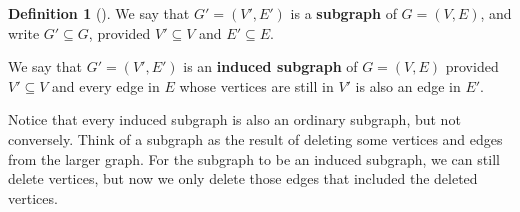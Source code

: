 \documentclass[10pt,]{book}
\newcommand{\terminology}[1]{\textbf{#1}}
\theoremstyle{plain}
\theoremstyle{definition}
\newtheorem{definition}[theorem]{Definition}
\theoremstyle{definition}
\theoremstyle{definition}
\numberwithin{equation}{chapter}
\begin{document}
\begin{definition}[{}]\label{definition-3}
\hypertarget{p-84}{}%
We say that \(G' = (V', E')\) is a \terminology{subgraph} of \(G = (V, E)\), and write \(G' \subseteq G\), provided \(V' \subseteq V\) and \(E' \subseteq E\).%
\par
\hypertarget{p-85}{}%
We say that \(G' = (V', E')\) is an \terminology{induced subgraph} of \(G = (V, E)\) provided \(V' \subseteq V\) and every edge in \(E\) whose vertices are still in \(V'\) is also an edge in \(E'\).%
\end{definition}
\hypertarget{p-86}{}%
Notice that every induced subgraph is also an ordinary subgraph, but not conversely.  Think of a subgraph as the result of deleting some vertices and edges from the larger graph.  For the subgraph to be an induced subgraph, we can still delete vertices, but now we only delete those edges that included the deleted vertices.%
\end{document}
